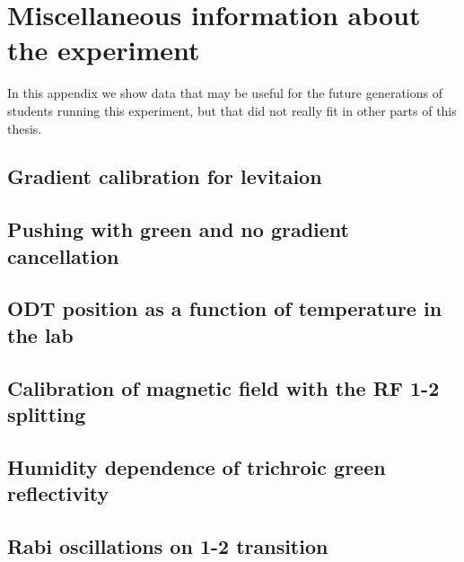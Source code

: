 
\chapter{Miscellaneous information about the experiment}
\label{app:misc}


In this appendix we show data that may be useful for the future generations of
students running this experiment, but that did not really fit in other parts of
this thesis. 

\section{Gradient calibration for levitaion}  
\section{Pushing with green and no gradient cancellation}
\section{ODT position as a function of temperature in the lab}
\section{Calibration of magnetic field with the RF 1-2 splitting}
\section{Humidity dependence of trichroic green reflectivity}
\section{Rabi oscillations on 1-2 transition}





